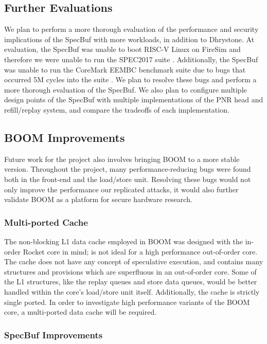 \subsection{Further Evaluations}

We plan to perform a more thorough evaluation of the performance and security implications of the
SpecBuf with more workloads, in addition to Dhrystone. At evaluation, the SpecBuf was unable to boot
RISC-V Linux on FireSim and therefore we were unable to run the SPEC2017 suite \cite{b50}.
Additionally, the SpecBuf was unable to run the CoreMark EEMBC benchmark suite due to bugs that
occurred 5M cycles into the suite \cite{b51}. We plan to resolve these bugs and perform a more
thorough evaluation of the SpecBuf. We also plan to configure multiple design
points of the SpecBuf with multiple implementations of the PNR head and refill/replay system,
and compare the tradeoffs of each implementation.

\subsection{BOOM Improvements}

Future work for the project also involves bringing BOOM to a more stable version. Throughout
the project, many performance-reducing bugs were found both in the front-end and the 
load/store unit. Resolving these bugs would not only improve the performance our replicated attacks,
it would also further validate BOOM as a platform for secure hardware research.

\subsubsection{Multi-ported Cache}

The non-blocking L1 data cache employed in BOOM was designed with the in-order Rocket core in mind;
is not ideal for a high performance out-of-order core. The cache does not have any concept of
speculative execution, and contains many structures and provisions which are superfluous in an
out-of-order core. Some of the L1 structures, like the replay queues and store data queues, would be
better handled within the core's load/store unit itself.
Additionally, the cache is strictly single ported. In order to investigate high performance variants
of the BOOM core, a multi-ported data cache will be required.

\subsubsection{SpecBuf Improvements}

